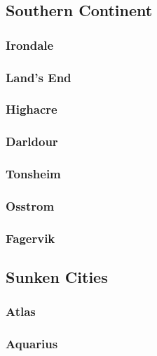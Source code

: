 	\subsection{Southern Continent}

		\subsubsection{Irondale}

		\subsubsection{Land's End}

		\subsubsection{Highacre}
	
		\subsubsection{Darldour}

		\subsubsection{Tonsheim}

		\subsubsection{Osstrom}

		\subsubsection{Fagervik}

	\subsection{Sunken Cities}

		\subsubsection{Atlas}

		\subsubsection{Aquarius}
